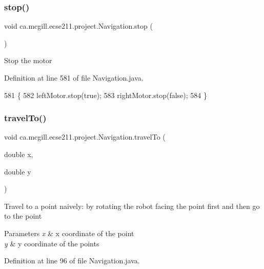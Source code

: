 \subsubsection{\texorpdfstring{stop()}{stop()}}
{\footnotesize\ttfamily void ca.\+mcgill.\+ecse211.\+project.\+Navigation.\+stop (\begin{DoxyParamCaption}{ }\end{DoxyParamCaption})}

Stop the motor 

Definition at line 581 of file Navigation.\+java.


\begin{DoxyCode}
581                      \{
582     leftMotor.stop(\textcolor{keyword}{true});
583     rightMotor.stop(\textcolor{keyword}{false});
584   \}
\end{DoxyCode}
\mbox{\label{classca_1_1mcgill_1_1ecse211_1_1project_1_1_navigation_ad89b3dd084d81b4ec4d89ea73ba13eaa}} 
\subsubsection{\texorpdfstring{travel\+To()}{travelTo()}}
{\footnotesize\ttfamily void ca.\+mcgill.\+ecse211.\+project.\+Navigation.\+travel\+To (\begin{DoxyParamCaption}\item[{double}]{x,  }\item[{double}]{y }\end{DoxyParamCaption})}

Travel to a point naively\+: by rotating the robot facing the point first and then go to the point 
\begin{DoxyParams}{Parameters}
{\em x} & x coordinate of the point \\
\hline
{\em y} & y coordinate of the points \\
\hline
\end{DoxyParams}


Definition at line 96 of file Navigation.\+java.


